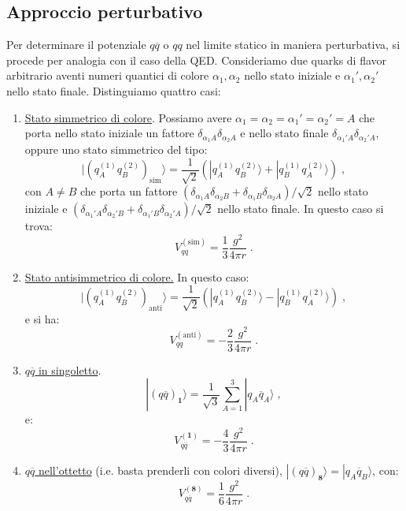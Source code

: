 \documentclass[12pt,a4paper]{article}
\theoremstyle{definition}
\newcommand{\ket}{\rangle}
\numberwithin{equation}{section}
\begin{document}
\subsection{Approccio perturbativo}
Per determinare il potenziale $q\overline{q}$ o $qq$ nel limite statico in maniera perturbativa, si procede per analogia con il caso della QED. Consideriamo due quarks di flavor arbitrario aventi numeri quantici di colore $\alpha_1,\alpha_2$ nello stato iniziale e $\alpha_1',\alpha_2'$ nello stato finale. Distinguiamo quattro casi:
\begin{enumerate}
\item \underline{Stato simmetrico di colore}. Possiamo avere $\alpha_1=\alpha_2=\alpha_1'=\alpha_2'=A$ che porta nello stato iniziale un fattore $\delta_{\alpha_1A}\delta_{\alpha_2A}$ e nello stato finale $\delta_{\alpha_1'A}\delta_{\alpha_2'A}$, oppure uno stato simmetrico del tipo:
$$
|(q_A^{(1)}q_B^{(2)})_{\mathrm{sim}}\ket=\frac{1}{\sqrt{2}}\left(|q_A^{(1)}q_B^{(2)}\ket+|q_B^{(1)}q_A^{(2)}\ket\right)\;,
$$
con $A\ne B$ che porta un fattore $(\delta_{\alpha_1A}\delta_{\alpha_2B}+\delta_{\alpha_1B}\delta_{\alpha_2A})/\sqrt{2}$ nello stato iniziale e $(\delta_{\alpha_1'A}\delta_{\alpha_2'B}+\delta_{\alpha_1'B}\delta_{\alpha_2'A})/\sqrt{2}$ nello stato finale. In questo caso si trova:
\begin{equation}
V_{qq}^{\mathrm{(sim)}}=\frac{1}{3}\frac{g^2}{4\pi r}\;.
\end{equation}
\item \underline{Stato antisimmetrico di colore.} In questo caso:
$$
|\left(q_A^{(1)}q_B^{(2)}\right)_{\mathrm{anti}}\ket=\frac{1}{\sqrt{2}}\left(|q_A^{(1)}q_B^{(2)}\ket-|q_B^{(1)}q_A^{(2)}\ket\right)\;,
$$
e si ha:
\begin{equation}
V_{qq}^{\mathrm{(anti)}}=-\frac{2}{3}\frac{g^2}{4\pi r}\;.
\end{equation}
\item \underline{$q\overline{q}$ in singoletto}.
$$
|(q\overline{q})_{\mathbf{1}}\ket=\frac{1}{\sqrt{3}}\sum_{A=1}^3|q_A\overline{q}_A\ket\;,
$$
e:
\begin{equation}
V_{q\overline{q}}^{(\mathbf{1})}=-\frac{4}{3}\frac{g^2}{4\pi r}\;.
\end{equation}
\item \underline{$q\overline{q}$ nell'ottetto} (i.e. basta prenderli con colori diversi), $|(q\overline{q})_{\mathbf{8}}\ket=|q_A\overline{q}_B\ket$, con:
\begin{equation}
V_{q\overline{q}}^{(\mathbf{8})}=\frac{1}{6}\frac{g^2}{4\pi r}\;.
\end{equation}
\end{enumerate}
\end{document}
